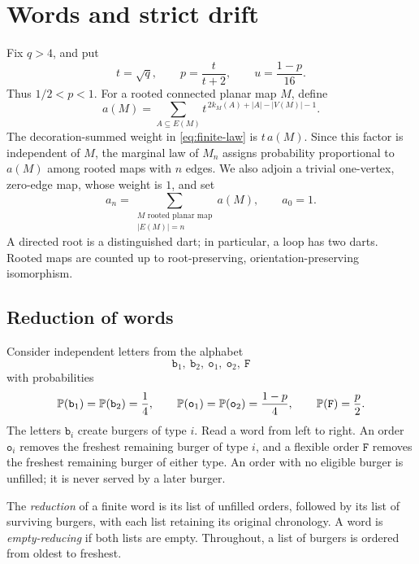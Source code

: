 \section{Words and strict drift}\label{word:section}

Fix $q>4$, and put
\begin{equation}\label{word:parameters}
 t=\sqrt q,\qquad p=\frac{t}{t+2},\qquad u=\frac{1-p}{16}.
\end{equation}
Thus $1/2<p<1$. For a rooted connected planar map $M$, define
\begin{equation}\label{word:weight}
 a(M)=\sum_{A\subseteq E(M)}
       t^{\,2k_M(A)+|A|-|V(M)|-1}.
\end{equation}
The decoration-summed weight in \eqref{eq:finite-law} is $t\,a(M)$. Since this
factor is independent of $M$, the marginal law of $M_n$ assigns
probability proportional to $a(M)$ among rooted maps with $n$ edges.
We also adjoin a trivial one-vertex, zero-edge map, whose weight is $1$,
and set
\[
 a_n=\sum_{\substack{M\text{ rooted planar map}\\ |E(M)|=n}}a(M),
 \qquad a_0=1.
\]
A directed root is a distinguished dart; in particular, a loop has two
darts. Rooted maps are counted up to root-preserving,
orientation-preserving isomorphism.

\subsection{Reduction of words}

Consider independent letters from the alphabet
\[
 \mathtt b_1,\ \mathtt b_2,\ \mathtt o_1,\ \mathtt o_2,\ \mathtt F
\]
with probabilities
\begin{equation}\label{word:letterlaw}
 \P(\mathtt b_1)=\P(\mathtt b_2)=\frac14,
 \qquad
 \P(\mathtt o_1)=\P(\mathtt o_2)=\frac{1-p}{4},
 \qquad \P(\mathtt F)=\frac p2.
\end{equation}
The letters $\mathtt b_i$ create burgers of type $i$. Read a word from
left to right. An order $\mathtt o_i$ removes the freshest remaining
burger of type $i$, and a flexible order $\mathtt F$ removes the freshest
remaining burger of either type. An order with no eligible burger is
unfilled; it is never served by a later burger.

The \emph{reduction} of a finite word is its list of unfilled orders,
followed by its list of surviving burgers, with each list retaining its
original chronology. A word is \emph{empty-reducing} if both lists are
empty. Throughout, a list of burgers is ordered from oldest to freshest.

